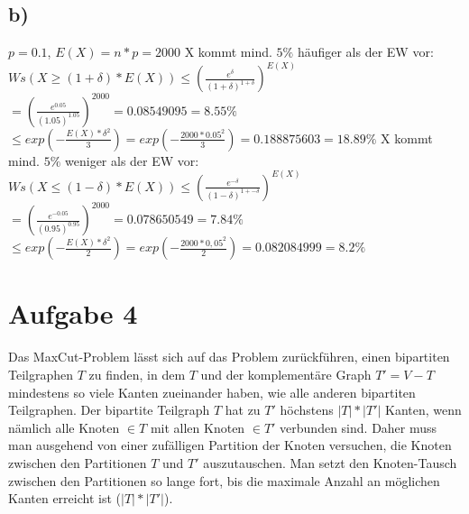 \documentclass[a4paper,10pt,oneside,leqno]{scrartcl}
\begin{document}
\subsection*{b)}
$p = 0.1$, $E(X) = n*p = 2000$\newline
X kommt mind. $5\%$ häufiger als der EW vor:\newline
$Ws(X \geq (1+\delta) * E(X)) \leq (\frac{e^{\delta}}{(1+\delta)^{1+\delta}})^{E(X)}$\newline
$=(\frac{e^{0.05}}{(1.05)^{1.05}})^{2000} = 0.08549095 = 8.55\%$\newline
$\leq exp(-\frac{E(X)*\delta^2}{3}) = exp(-\frac{2000*0.05^2}{3}) = 0.188875603 = 18.89\%$\newline \newline
X kommt mind. $5\%$ weniger als der EW vor:\newline
$Ws(X \leq (1-\delta) * E(X)) \leq (\frac{e^{-\delta}}{(1-\delta)^{1+-\delta}})^{E(X)}$\newline
$=(\frac{e^{-0.05}}{(0.95)^{0.95}})^{2000} = 0.078650549 = 7.84\%$\newline
$\leq exp(-\frac{E(X)*\delta^2}{2}) = exp(-\frac{2000*0,05^2}{2}) = 0.082084999 = 8.2\%$\newline

\section*{Aufgabe 4}%
Das MaxCut-Problem lässt sich auf das Problem zurückführen, einen bipartiten Teilgraphen $T$ zu finden,
in dem $T$ und der komplementäre Graph $T' = V - T$ mindestens so viele Kanten zueinander haben, wie alle
anderen bipartiten Teilgraphen.\newline
Der bipartite Teilgraph $T$ hat zu $T'$ höchstens $|T| * |T'|$ Kanten, wenn nämlich alle Knoten $\in T$ mit allen
Knoten $\in T'$ verbunden sind. Daher muss man ausgehend von einer zufälligen Partition der Knoten versuchen,
die Knoten zwischen den Partitionen $T$ und $T'$ auszutauschen. Man setzt den Knoten-Tausch zwischen den Partitionen so lange fort, bis die maximale
Anzahl an möglichen Kanten erreicht ist ($|T| * |T'|$).
\end{document}
